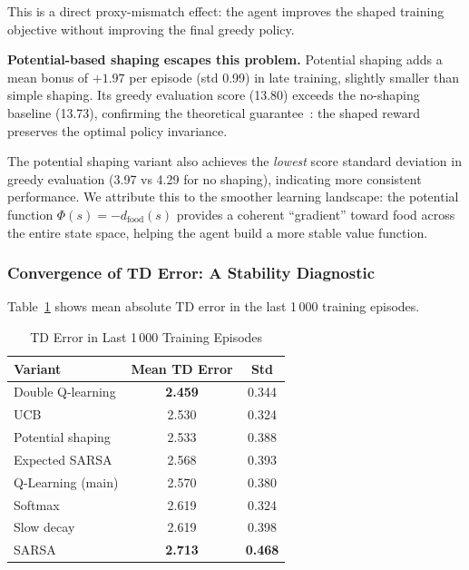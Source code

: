 \documentclass[10pt,conference]{IEEEtran}
\begin{document}
This is a direct proxy-mismatch effect: the agent improves the
shaped training objective without improving the final greedy policy.

\textbf{Potential-based shaping escapes this problem.}
Potential shaping adds a mean bonus of $+1.97$ per episode
(std 0.99) in late training, slightly smaller than simple shaping.
Its greedy evaluation score (13.80) exceeds the no-shaping baseline
(13.73), confirming the theoretical guarantee~\cite{ng1999policy}:
the shaped reward preserves the optimal policy invariance.

The potential shaping variant also achieves the \emph{lowest}
score standard deviation in greedy evaluation (3.97 vs 4.29
for no shaping), indicating more consistent performance.
We attribute this to the smoother learning landscape: the potential
function $\Phi(s)=-d_{\text{food}}(s)$ provides a coherent
``gradient'' toward food across the entire state space,
helping the agent build a more stable value function.

\subsubsection{Convergence of TD Error: A Stability Diagnostic}

Table~\ref{tab:tderr} shows mean absolute TD error in the last
1\,000 training episodes.

\begin{table}[h]
  \centering
  \caption{TD Error in Last 1\,000 Training Episodes}
  \label{tab:tderr}
  \begin{tabular}{lcc}
    \toprule
    Variant & Mean TD Error & Std \\
    \midrule
    Double Q-learning          & \textbf{2.459} & 0.344 \\
    UCB                        & 2.530 & 0.324 \\
    Potential shaping          & 2.533 & 0.388 \\
    Expected SARSA             & 2.568 & 0.393 \\
    Q-Learning (main)          & 2.570 & 0.380 \\
    Softmax                    & 2.619 & 0.324 \\
    Slow decay                 & 2.619 & 0.398 \\
    SARSA                      & \textbf{2.713} & \textbf{0.468} \\
    \bottomrule
  \end{tabular}
\end{table}
\end{document}
